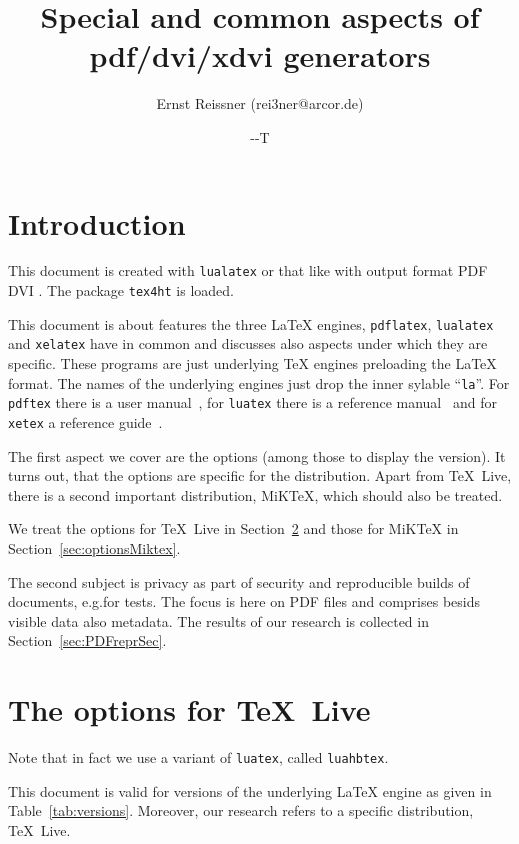 \documentclass[a4paper, english]{article}%
\title{Special and common aspects of pdf/dvi/xdvi generators }
\author{Ernst Reissner (rei3ner@arcor.de)}
\date{\the\year-\the\month-\the\day{}T\printtime}%
\newcommand{\pdflatex}{\texttt{pdflatex}}
\newcommand{\lualatex}{\texttt{lualatex}}
\newcommand{\xelatex}{\texttt{xelatex}}
\newcommand{\texlive}{\TeX~Live}
\newcommand{\miktex}{MiKTeX}
\begin{document}
\maketitle
\tableofcontents
\listoftables
\lstlistoflistings%

\section{Introduction}

This document is created with \lualatex{} or that like 
with output format 
\ifpdf%
PDF%
\else
DVI%
\fi.
The package \texttt{tex4ht} 
is  loaded. 

This document is about features the three \LaTeX{} engines, 
\pdflatex, \lualatex{} and \xelatex{} have in common 
and discusses also aspects under which they are specific. 
These programs are just underlying \TeX{} engines preloading the \LaTeX{} format. 
The names of the underlying engines just drop the inner sylable ``\texttt{la}''. 
For \texttt{pdftex} there is a user manual~\cite{PdfTexUsr24}, 
for \texttt{luatex} there is a reference manual~\cite{LuaTexRef24} and 
for \texttt{xetex} a reference guide~\cite{XeTexRef24}. 

The first aspect we cover are the options (among those to display the version). 
It turns out, that the options are specific for the distribution. 
Apart from \texlive{}, there is a second important distribution, \miktex, 
which should also be treated. 

We treat the options for \texlive{} in Section~\ref{sec:optionsTexlive} 
and those for \miktex{} in Section~\ref{sec:optionsMiktex}. 

The second subject is privacy as part of security 
and reproducible builds of documents, e.g.\@ for tests. 
The focus is here on PDF files and comprises besids visible data 
also metadata. 
The results of our research is collected in Section~\ref{sec:PDFreprSec}. 

\section{The options for \texlive}\label{sec:optionsTexlive}


Note that in fact we use a variant of \texttt{luatex}, called \texttt{luahbtex}. 

This document is valid for versions of the underlying \LaTeX{} engine 
as given in Table~\ref{tab:versions}. 
Moreover, our research refers to a specific distribution, \texlive. 
\end{document}
